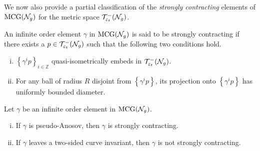 We now also provide a partial classification of the \emph{strongly contracting} elements of $\mathrm{MCG}(\mathcal{N}_g)$ for the metric space $\mathcal{T}_{\varepsilon_t}^{-}(\mathcal{N}_g)$.

\begin{definition}
  An infinite order element $\gamma$ in $\mathrm{MCG}(\mathcal{N}_g)$ is said to be strongly contracting if there exists a $p \in \mathcal{T}_{\varepsilon_t}^{-}(\mathcal{N}_g)$ such that the following two conditions hold.
  \begin{enumerate}[(i)]
  \item $\left\{ \gamma^i p \right\}_{i \in \mathbb{Z}}$ quasi-isometrically embeds in $\mathcal{T}_{\varepsilon_t}^{-}(\mathcal{N}_g)$.
  \item For any ball of radius $R$ disjoint from $\left\{ \gamma^i p \right\}$, its projection onto $\left\{ \gamma^i p \right\}$ has uniformly bounded diameter.
  \end{enumerate}
\end{definition}

\begin{lemma}
  \label{lem:strongly-contract-class}
  Let $\gamma$ be an infinite order element in $\mathrm{MCG}(\mathcal{N}_g)$.
  \begin{enumerate}[(i)]
  \item If $\gamma$ is pseudo-Anosov, then $\gamma$ is strongly contracting.
  \item If $\gamma$ leaves a two-sided curve invariant, then $\gamma$ is not strongly contracting.
  \end{enumerate}
\end{lemma}

